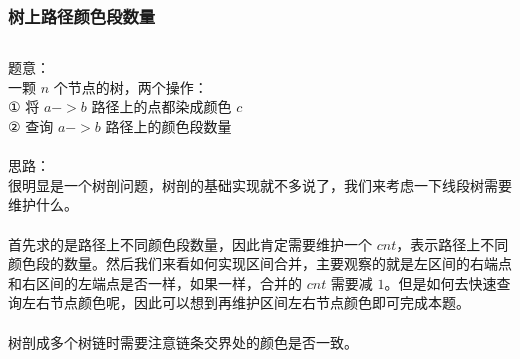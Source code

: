 \documentclass[twoside]{article}
\begin{document}
\subsubsection{树上路径颜色段数量}
\begin{lstlisting}
\end{lstlisting}
题意：\\
一颗 $n$ 个节点的树，两个操作：\\
$①$ 将 $a->b$ 路径上的点都染成颜色 $c$\\
$②$ 查询 $a->b$ 路径上的颜色段数量\\
\\
思路：\\
很明显是一个树剖问题，树剖的基础实现就不多说了，我们来考虑一下线段树需要维护什么。\\
\\
首先求的是路径上不同颜色段数量，因此肯定需要维护一个 $cnt$，表示路径上不同颜色段的数量。然后我们来看如何实现区间合并，主要观察的就是左区间的右端点和右区间的左端点是否一样，如果一样，合并的 $cnt$ 需要减 $1$。但是如何去快速查询左右节点颜色呢，因此可以想到再维护区间左右节点颜色即可完成本题。\\
\\
树剖成多个树链时需要注意链条交界处的颜色是否一致。\\
\end{document}

